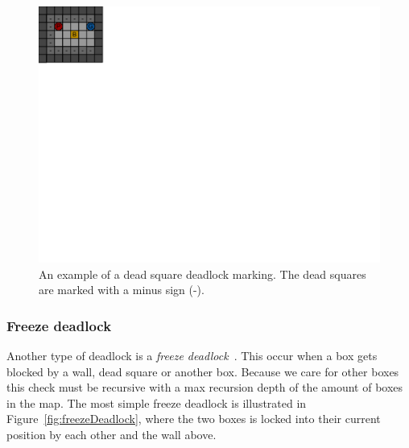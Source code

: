 \documentclass[a4paper,12pt]{article}
\renewcommand{\*}[0]{\cdot}
\begin{document}
\begin{figure}[h!]
    \begin{center}
        \includegraphics{figures/deadSquareDeadlock}
    \end{center}
    \caption{An example of a dead square deadlock marking. The dead squares are
    marked with a minus sign (-).}
    \label{fig:deadSquareDeadlock}
\end{figure}

\subsubsection{Freeze deadlock}

Another type of deadlock is a \emph{freeze deadlock}~\cite{sokobano:deadlocks}.
This occur when a box gets blocked by a wall, dead square or another box.
Because we care for other boxes this check must be recursive with a max
recursion depth of the amount of boxes in the map. The most simple freeze
deadlock is illustrated in Figure~\ref{fig:freezeDeadlock}, where the two boxes
is locked into their current position by each other and the wall above.
\end{document}
